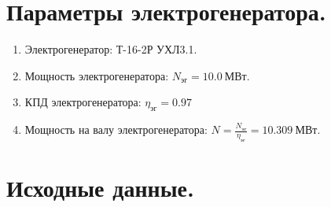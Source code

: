 \documentclass[a4paper,10pt]{article}
\begin{document}
    \section{Параметры электрогенератора.}

    
\begin{enumerate}
	\item Электрогенератор: Т-16-2Р УХЛ3.1.
	\item Мощность электрогенератора: $N_{эг} = 10.0\ МВт$.
	\item КПД электрогенератора: $\eta_{эг} = 0.97$
	\item Мощность на валу электрогенератора: $N = \frac{N_{эг}}{\eta_{эг}} = 10.309\ МВт$.
\end{enumerate}


    \section{Исходные данные.}
\end{document}
